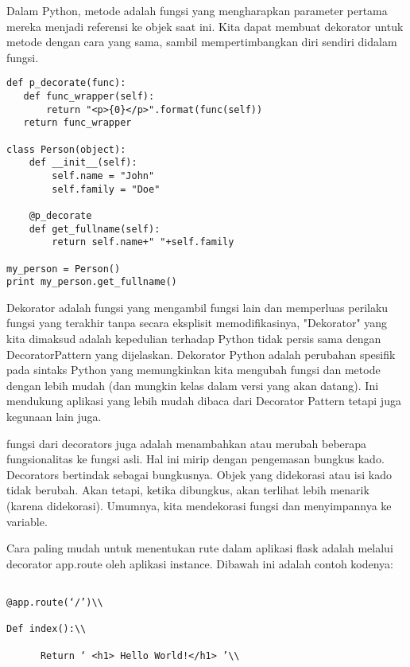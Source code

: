 Dalam Python, metode adalah fungsi yang mengharapkan parameter pertama mereka menjadi referensi ke objek saat ini. Kita dapat membuat dekorator untuk metode dengan cara yang sama, sambil mempertimbangkan diri sendiri didalam fungsi.

\begin{verbatim}
def p_decorate(func):
   def func_wrapper(self):
       return "<p>{0}</p>".format(func(self))
   return func_wrapper

class Person(object):
    def __init__(self):
        self.name = "John"
        self.family = "Doe"

    @p_decorate
    def get_fullname(self):
        return self.name+" "+self.family

my_person = Person()
print my_person.get_fullname()

\end{verbatim}

Dekorator adalah fungsi yang mengambil fungsi lain dan memperluas perilaku fungsi yang terakhir tanpa secara eksplisit memodifikasinya, "Dekorator" yang kita dimaksud adalah kepedulian terhadap Python tidak persis sama dengan DecoratorPattern yang dijelaskan. Dekorator Python adalah perubahan spesifik pada sintaks Python yang memungkinkan kita mengubah fungsi dan metode dengan lebih mudah (dan mungkin kelas dalam versi yang akan datang). Ini mendukung aplikasi yang lebih mudah dibaca dari Decorator Pattern tetapi juga kegunaan lain juga.



fungsi dari decorators juga adalah menambahkan atau merubah beberapa fungsionalitas ke fungsi asli. Hal ini mirip dengan pengemasan bungkus kado. Decorators bertindak sebagai bungkusnya. Objek yang didekorasi atau isi kado tidak berubah. Akan tetapi, ketika dibungkus, akan terlihat lebih menarik (karena didekorasi). Umumnya, kita mendekorasi fungsi dan menyimpannya ke variable.



Cara paling mudah untuk menentukan rute dalam aplikasi flask adalah melalui decorator app.route oleh aplikasi instance. Dibawah ini adalah contoh kodenya:\\

\begin{verbatim}

@app.route(‘/’)\\

Def index():\\

      Return ‘ <h1> Hello World!</h1> ’\\

\end{verbatim}



